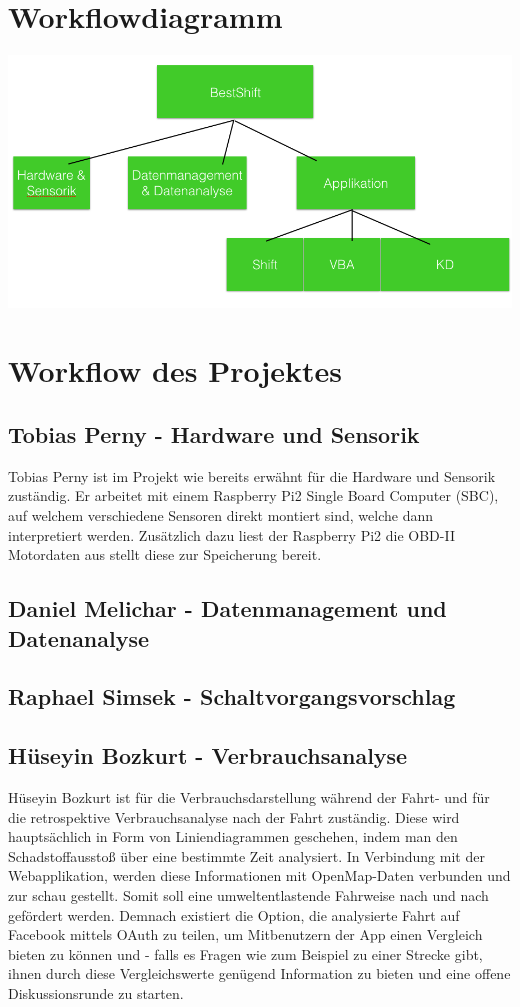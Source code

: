 \section{Workflowdiagramm}
\includegraphics[scale=0.5]{images/Workflowdiagramm.png}

\newline
\section{Workflow des Projektes}
	\subsection{Tobias Perny - Hardware und Sensorik}
	Tobias Perny ist im Projekt wie bereits erwähnt für die Hardware und Sensorik zuständig. 
	Er arbeitet mit einem Raspberry Pi2 Single Board Computer (SBC), auf welchem verschiedene 
	Sensoren direkt montiert sind, welche dann interpretiert werden. 
	Zusätzlich dazu liest der Raspberry Pi2 die OBD-II Motordaten aus stellt diese zur Speicherung bereit.

	\subsection{Daniel Melichar - Datenmanagement und Datenanalyse}
	 
	\subsection{Raphael Simsek - Schaltvorgangsvorschlag}

	\subsection{Hüseyin Bozkurt - Verbrauchsanalyse}
	 Hüseyin Bozkurt ist für die Verbrauchsdarstellung während der Fahrt-
	 und für die retrospektive Verbrauchsanalyse nach der Fahrt zuständig.
	 Diese wird hauptsächlich in Form von Liniendiagrammen geschehen, indem man
	 den Schadstoffausstoß über eine bestimmte Zeit analysiert.
	 In Verbindung mit der Webapplikation, werden diese Informationen mit OpenMap-Daten verbunden und zur schau
	 gestellt.
	 Somit soll eine umweltentlastende Fahrweise nach und nach gefördert werden.
	 Demnach existiert die Option, die analysierte Fahrt auf Facebook mittels OAuth zu teilen, 
	 um Mitbenutzern der App einen Vergleich bieten zu können und - falls es Fragen wie zum Beispiel zu einer Strecke gibt,
	 ihnen durch diese Vergleichswerte genügend Information zu bieten und eine offene Diskussionsrunde zu starten.
